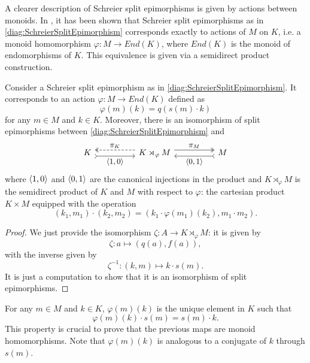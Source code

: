 A clearer description of Schreier split epimorphisms is given by actions between monoids. In \cite{martins2013semidirect}, it has been shown that Schreier split epimorphisms as in \eqref{diag:SchreierSplitEpimorphism} corresponds exactly to actions of $M$ on $K$, i.e. a monoid homomorphism $\varphi:M\to End(K)$, where $End(K)$ is the monoid of endomorphisms of $K$. This equivalence is given via a semidirect product construction.

\begin{proposition}
\label{prop:SchreierSplitSemidirect}
    Consider a Schreier split epimorphism as in \eqref{diag:SchreierSplitEpimorphism}. It corresponds to an action $\varphi:M\to End(K)$ defined as
    \[ \varphi(m)(k) = q(s(m)\cdot k) \]
    for any $m\in M$ and $k\in K$. Moreover, there is an isomorphism of split epimorphisms between \eqref{diag:SchreierSplitEpimorphism} and
    \begin{equation}
    \label{diag:SchreierSplitSemidirect}
        \begin{tikzcd}[every label/.append style = {font = \small}]
            K \arrow[rr, "\limitmorph{1}{0}"', tail, shift right=1.5] & & K\rtimes_\varphi M \arrow[ll, "\pi_K"', shift right=1.5, dashed, two heads] \arrow[rr, "\pi_M", two heads, shift left=1.5] & & M \arrow[ll, "\limitmorph{0}{1}", tail, shift left=1.5]
        \end{tikzcd}
    \end{equation}
    where $\langle{1},{0}\rangle$ and $\langle{0},{1}\rangle$ are the canonical injections in the product and $K\rtimes_\varphi M$ is the semidirect product of $K$ and $M$ with respect to $\varphi$: the cartesian product $K\times M$ equipped with the operation
    \[ (k_1,m_1)\cdot (k_2,m_2) = (k_1\cdot \varphi(m_1)(k_2), m_1\cdot m_2). \]
    \begin{proof}
        We just provide the isomorphism $\zeta:A\longrightarrow K\rtimes_\varphi M$: it is given by
        \[ \zeta:a\longmapsto (q(a),f(a)), \]
        with the inverse given by
        \[ \zeta^{-1}:(k,m)\longmapsto k\cdot s(m). \]
        It is just a computation to show that it is an isomorphism of split epimorphisms.
    \end{proof}
\end{proposition}
\begin{oss*}
    For any $m\in M$ and $k\in K$, $\varphi(m)(k)$ is the unique element in $K$ such that
    \[ \varphi(m)(k)\cdot s(m) = s(m)\cdot k. \]
    This property is crucial to prove that the previous maps are monoid homomorphisms. Note that $\varphi(m)(k)$ is analogous to a conjugate of $k$ through $s(m)$.
\end{oss*}

